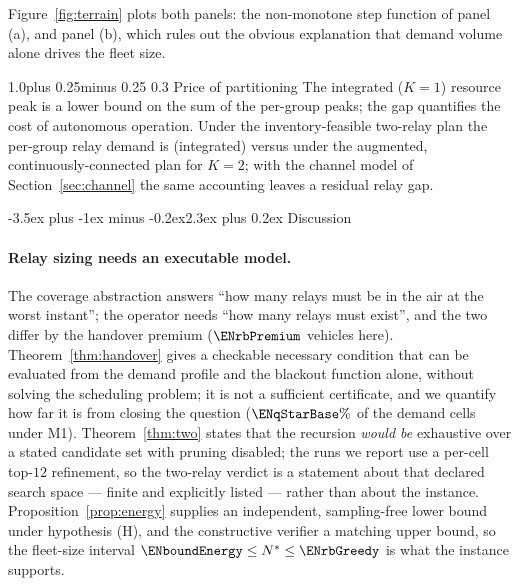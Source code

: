 \documentclass[11pt]{article}
\makeatletter
\def\section{\@startsection{section}{1}{\z@}%
    {1.0\baselineskip plus 0.25\baselineskip minus 0.25\baselineskip}%
    {0.4\baselineskip}%
    {\normalfont\normalsize\centering\bfseries}}%
\def\subsection{\@startsection{subsection}{2}{\z@}%
    {1.0\baselineskip plus 0.25\baselineskip minus 0.25\baselineskip}%
    {0.3\baselineskip}%
    {\normalfont\normalsize\itshape}}%
\renewcommand{\section}{\@startsection{section}{1}{\z@}%
      {-3.5ex plus -1ex minus -0.2ex}{2.3ex plus 0.2ex}%
      {\normalfont\Large\bfseries}}%
\renewcommand{\section}{\@startsection{section}{1}{\z@}%
      {-3.5ex plus -1ex minus -0.2ex}{2.3ex plus 0.2ex}%
      {\normalfont\large\bfseries}}%
\theoremstyle{dshplain}
\theoremstyle{dshdefn}
\makeatother
\begin{document}
Figure~\ref{fig:terrain} plots both panels: the non-monotone step function of
panel (a), and panel (b), which rules out the obvious explanation that demand
volume alone drives the fleet size.

\subsection{Price of partitioning}
\label{sec:partition}
The integrated ($K=1$) resource peak is a lower bound on the sum of the
per-group peaks; the gap quantifies the cost of autonomous operation. Under the
inventory-feasible two-relay plan the per-group relay demand is
\ENqfourAKtwoRelayNeed{} (integrated) versus \ENqfourBKtwoRelayNeed{} under the
augmented, continuously-connected plan for $K=2$; with the channel model of
Section~\ref{sec:channel} the same accounting leaves a residual relay gap.

\section{Discussion}
\label{sec:discussion}
\paragraph{Relay sizing needs an executable model.}
The coverage abstraction answers ``how many relays must be in the air at the
worst instant''; the operator needs ``how many relays must exist'', and the two
differ by the handover premium ($\ENrbPremium$ vehicles here). Theorem~\ref{thm:handover}
gives a checkable necessary condition that can be evaluated from the demand
profile and the blackout function alone, without solving the scheduling problem;
it is not a sufficient certificate, and we quantify how far it is from closing the
question ($\ENqStarBase\%$ of the demand cells under M1). Theorem~\ref{thm:two} states that
the recursion \emph{would be} exhaustive over a stated candidate set with pruning
disabled; the runs we report use a per-cell top-$12$ refinement, so the two-relay
verdict is a statement about that declared search space --- finite and explicitly
listed --- rather than about the instance. Proposition~\ref{prop:energy} supplies
an independent, sampling-free lower bound under hypothesis (H), and the
constructive verifier a matching upper bound, so the fleet-size interval
$\ENboundEnergy\le N^{*}\le\ENrbGreedy$ is what the instance supports.
\end{document}
